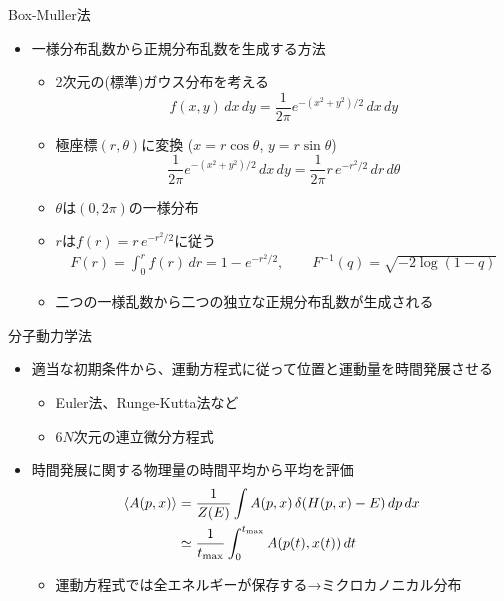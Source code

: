 \documentclass[dvipdfmx]{beamer}
\begin{document}
\begin{frame}[t,fragile]{Box-Muller法}
  \begin{itemize}
    \setlength{\itemsep}{1em}
  \item 一様分布乱数から正規分布乱数を生成する方法
    \begin{itemize}
    \item 2次元の(標準)ガウス分布を考える
      \[
      f(x,y)\,dx\,dy= \frac{1}{2\pi} e^{-(x^2+y^2)/2} \,dx\,dy
      \]
    \item 極座標$(r,\theta)$に変換 ($x=r\cos\theta$, $y=r\sin\theta$)
      \[
      \frac{1}{2\pi} e^{-(x^2+y^2)/2} \,dx\,dy = \frac{1}{2\pi} r \, e^{-r^2/2} \,dr\,d\theta
      \]
    \item $\theta$は$(0,2\pi)$の一様分布
    \item $r$は$f(r) = r \, e^{-r^2/2}$に従う
      \begin{align*}
        F(r) = \int_0^r f(r) \, dr = 1 - e^{-r^2/2}, \qquad F^{-1}(q) = \sqrt{- 2 \log(1-q)}
      \end{align*}
    \item 二つの一様乱数から二つの独立な正規分布乱数が生成される
    \end{itemize}
  \end{itemize}
\end{frame}

\begin{frame}[t,fragile]{分子動力学法}
  \begin{itemize}
    \setlength{\itemsep}{1em}
  \item 適当な初期条件から、運動方程式に従って位置と運動量を時間発展させる
    \begin{itemize}
    \item Euler法、Runge-Kutta法など
    \item $6N$次元の連立微分方程式
    \end{itemize}
  \item 時間発展に関する物理量の時間平均から平均を評価
    \begin{align*}
      \langle A(p,x) \rangle &= \frac{1}{Z(E)} \int A(p,x) \, \delta(H(p,x)-E) \, dp \, dx \\
      &\simeq \frac{1}{t_{\rm max}} \int_0^{t_{\rm max}} A(p(t),x(t)) \, dt
    \end{align*}
    \begin{itemize}
    \item 運動方程式では全エネルギーが保存する→ミクロカノニカル分布
    \end{itemize}
  \end{itemize}
\end{frame}
\end{document}
